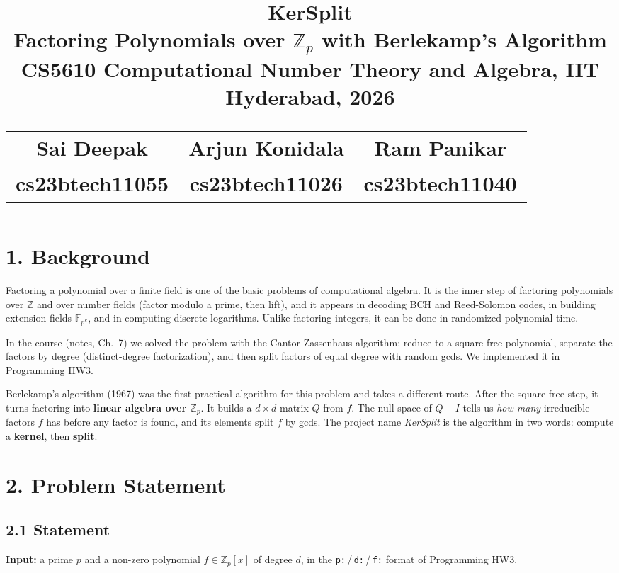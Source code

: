 \documentclass[11pt,a4paper]{article}
\title{\vspace{-2.4cm}\textbf{KerSplit}\\[6pt]
       \large Factoring Polynomials over $\mathbb{Z}_p$ with Berlekamp's Algorithm \\[4pt]
       \normalsize CS5610 Computational Number Theory and Algebra, IIT Hyderabad, 2026 \\[9pt]
       \begin{tabular}{ccc}Sai Deepak & Arjun Konidala & Ram Panikar \\ \small cs23btech11055 & \small cs23btech11026 & \small cs23btech11040\end{tabular}}
\author{}
\date{}
\newcommand{\Zp}{\mathbb{Z}_p}
\newcommand{\Zpx}{\mathbb{Z}_p[x]}
\begin{document}
\maketitle
\vspace{-1.0cm}

\section*{1. Background}

Factoring a polynomial over a finite field is one of the basic problems of computational
algebra. It is the inner step of factoring polynomials over $\mathbb{Z}$ and over number fields
(factor modulo a prime, then lift), and it appears in decoding BCH and Reed-Solomon codes, in
building extension fields $\mathbb{F}_{p^k}$, and in computing discrete logarithms. Unlike
factoring integers, it can be done in randomized polynomial time.

In the course (notes, Ch.~7) we solved the problem with the Cantor-Zassenhaus algorithm: reduce
to a square-free polynomial, separate the factors by degree (distinct-degree factorization), and
then split factors of equal degree with random gcds. We implemented it in Programming HW3.

Berlekamp's algorithm (1967) \cite{berlekamp67} was the first practical algorithm for this
problem and takes a different route. After the square-free step, it turns factoring into
\textbf{linear algebra over $\Zp$}. It builds a $d \times d$ matrix $Q$ from $f$. The null space of
$Q - I$ tells us \emph{how many} irreducible factors $f$ has before any factor is found, and its
elements split $f$ by gcds. The project name \emph{KerSplit} is the algorithm in two words:
compute a \textbf{kernel}, then \textbf{split}.

\section*{2. Problem Statement}

\subsection*{2.1 Statement}

\textbf{Input:} a prime $p$ and a non-zero polynomial $f \in \Zpx$ of degree $d$, in the
\texttt{p:}\,/\,\texttt{d:}\,/\,\texttt{f:} format of Programming HW3.
\end{document}
